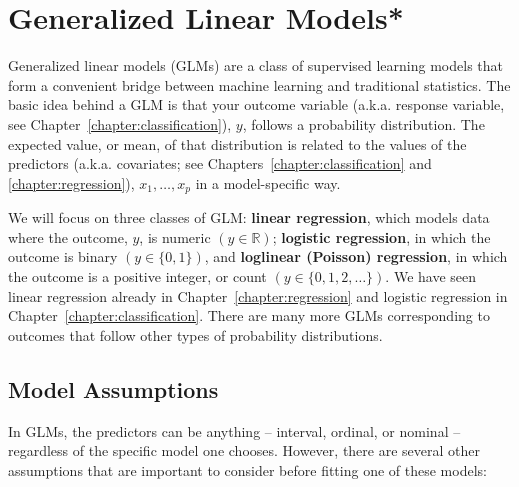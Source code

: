 \chapter{Generalized Linear Models* \label{chapter:glms}}

Generalized linear models (GLMs) are a class of supervised learning models that form a convenient bridge between machine learning and traditional statistics. The basic idea behind a GLM is that your outcome variable (a.k.a. response variable, see Chapter~\ref{chapter:classification}), $y$, follows a probability distribution. The expected value, or mean, of that distribution is related to the values of the predictors (a.k.a. covariates; see Chapters~\ref{chapter:classification} and \ref{chapter:regression}), $x_1, \dots, x_p$ in a model-specific way.

We will focus on three classes of GLM: \textbf{linear regression}, which models data where the outcome, $y$, is numeric $\left( y \in \mathbb{R} \right)$; \textbf{logistic regression}, in which the outcome is binary $\left( y \in \{0, 1\} \right)$, and \textbf{loglinear (Poisson) regression}, in which the outcome is a positive integer, or count $\left( y \in \{0, 1, 2, \dots\} \right)$. We have seen linear regression already in Chapter~\ref{chapter:regression} and logistic regression in Chapter~\ref{chapter:classification}. There are many more GLMs corresponding to outcomes that follow other types of probability distributions. 


\section{Model Assumptions}

In GLMs, the predictors can be anything -- interval, ordinal, or nominal -- regardless of the specific model one chooses. However, there are several other assumptions that are important to consider before fitting one of these models:

